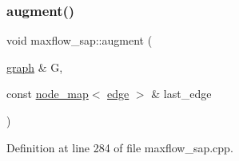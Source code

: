 \subsubsection{\texorpdfstring{augment()}{augment()}}
{\footnotesize\ttfamily void maxflow\+\_\+sap\+::augment (\begin{DoxyParamCaption}\item[{\mbox{\hyperlink{classgraph}{graph}} \&}]{G,  }\item[{const \mbox{\hyperlink{classnode__map}{node\+\_\+map}}$<$ \mbox{\hyperlink{classedge}{edge}} $>$ \&}]{last\+\_\+edge }\end{DoxyParamCaption})\hspace{0.3cm}{\ttfamily [protected]}}



Definition at line 284 of file maxflow\+\_\+sap.\+cpp.


